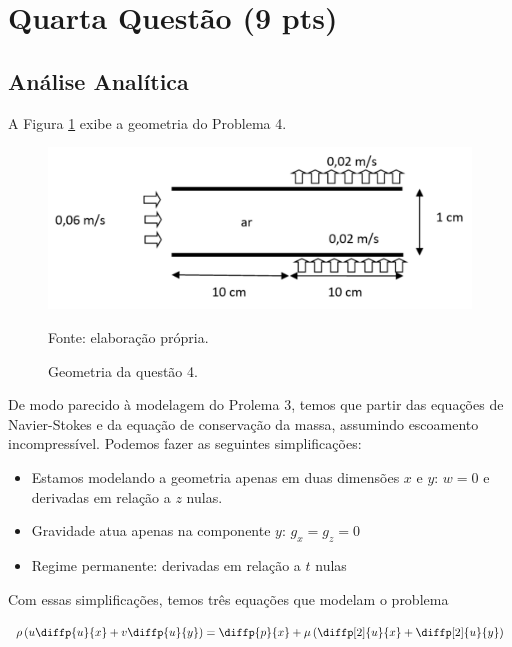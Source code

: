 
\section{Quarta Questão (9 pts)}

\subsection{Análise Analítica}


A Figura \ref*{fig:geometriaQ4} exibe a geometria do Problema 4.

\begin{figure}[h!]
    \caption{Geometria da questão 4.}
    \label{fig:geometriaQ4}
    \centering
    \centerline{\includegraphics[scale=0.35]{geometriaQ4.png}}
    \par{Fonte: elaboração própria.}
\end{figure}

De modo parecido à modelagem do Prolema 3, temos que partir das equações de Navier-Stokes e 
da equação de conservação da massa, assumindo escoamento incompressível. 
Podemos fazer as seguintes simplificações:

\begin{itemize}
    \item Estamos modelando a geometria apenas em duas dimensões $x$ e $y$: $w = 0$ e derivadas em relação a $z$ nulas.
    \item Gravidade atua apenas na componente $y$: $g_x = g_z = 0$
    \item Regime permanente: derivadas em relação a $t$ nulas
\end{itemize}

Com essas simplificações, temos três equações que modelam o problema

\begin{equation}\label{eq:Q4NS1}
        \rho\left(u\diffp{u}{x} + v\diffp{u}{y}\right)
         = \diffp{p}{x} + \mu \left(\diffp[2]{u}{x} + \diffp[2]{u}{y}\right)
\end{equation}

